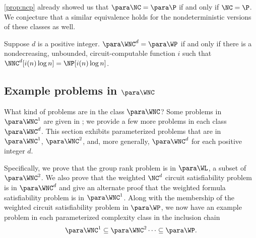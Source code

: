 \autoref{prop:ncp} already showed us that $\para \NC = \para \P$ if and only if $\NC = \P$.
We conjecture that a similar equivalence holds for the nondeterministic versions of these classes as well.

\begin{conjecture}\label{con:wncwp}
  Suppose $d$ is a positive integer.
  $\para \WNC^d = \para \WP$ if and only if there is a nondecreasing, unbounded, circuit-computable function $i$ such that $\NNC^d[i(n) \log n] = \NP[i(n) \log n]$.
\end{conjecture}

\subsection{Example problems in \texorpdfstring{$\para \WNC$}{paraWNC}}
\label{sec:rankinwp}

%
%
%
What kind of problems are in the class $\para \WNC$?
%
%
%
Some problems in $\para \WNC^1$ are given in \autocite{est15};
%
%
%
we provide a few more problems in each class $\para \WNC^d$.
%
%
%
This section exhibits parameterized problems that are in $\para \WNC^1$, $\para \WNC^2$, and, more generally, $\para \WNC^d$ for each positive integer $d$.

%
%
%
Specifically, we prove that the group rank problem is in $\para \WL$, a subset of $\para \WNC^2$.
We also prove that the weighted $\NC^d$ circuit satisfiability problem is in $\para \WNC^d$ and give an alternate proof that the weighted formula satisfiability problem is in $\para \WNC^1$.
%
%
%
Along with the membership of the weighted circuit satisfiability problem in $\para \WP$, we now have an example problem in each parameterized complexity class in the inclusion chain
$$
\para \WNC^1 \subseteq \para \WNC^2 \dotsb \subseteq \para \WP.
$$
%
%

